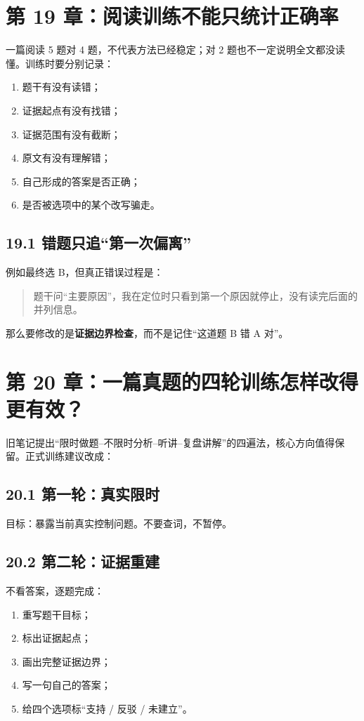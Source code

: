 \documentclass[11pt,a4paper]{ctexart}
\newcommand{\kw}[1]{\textbf{#1}}
\begin{document}
\section{第 19 章：阅读训练不能只统计正确率}
一篇阅读 5 题对 4 题，不代表方法已经稳定；对 2 题也不一定说明全文都没读懂。训练时要分别记录：
\begin{enumerate}
  \item 题干有没有读错；
  \item 证据起点有没有找错；
  \item 证据范围有没有截断；
  \item 原文有没有理解错；
  \item 自己形成的答案是否正确；
  \item 是否被选项中的某个改写骗走。
\end{enumerate}

\subsection{19.1 错题只追“第一次偏离”}
例如最终选 B，但真正错误过程是：
\begin{quote}
题干问“主要原因”，我在定位时只看到第一个原因就停止，没有读完后面的并列信息。
\end{quote}
那么要修改的是\kw{证据边界检查}，而不是记住“这道题 B 错 A 对”。

\section{第 20 章：一篇真题的四轮训练怎样改得更有效？}
旧笔记提出“限时做题--不限时分析--听讲--复盘讲解”的四遍法，核心方向值得保留。正式训练建议改成：

\subsection{20.1 第一轮：真实限时}
目标：暴露当前真实控制问题。不要查词，不暂停。

\subsection{20.2 第二轮：证据重建}
不看答案，逐题完成：
\begin{enumerate}
  \item 重写题干目标；
  \item 标出证据起点；
  \item 画出完整证据边界；
  \item 写一句自己的答案；
  \item 给四个选项标“支持 / 反驳 / 未建立”。
\end{enumerate}
\end{document}
